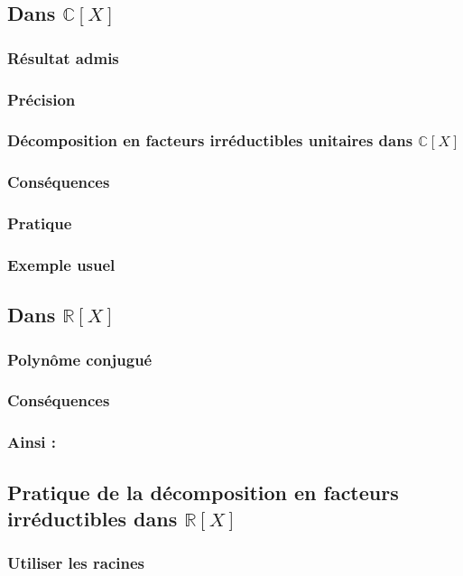 \documentclass[12pt,a4paper,french]{book}
\begin{document}
		\subsection{Dans $\mathbb{C}[X]$}
			\subsubsection{Résultat admis}
			\subsubsection{Précision}
			\subsubsection{Décomposition en facteurs irréductibles unitaires dans $\mathbb{C}[X]$}
			\subsubsection{Conséquences}
			\subsubsection{Pratique}
			\subsubsection{Exemple usuel}
		\subsection{Dans $\mathbb{R}[X]$}
			\subsubsection{Polynôme conjugué}
			\subsubsection{Conséquences}
			\subsubsection{Ainsi :}
		\subsection{Pratique de la décomposition en facteurs irréductibles dans $\mathbb{R}[X]$}
			\subsubsection{Utiliser les racines}
\end{document}
